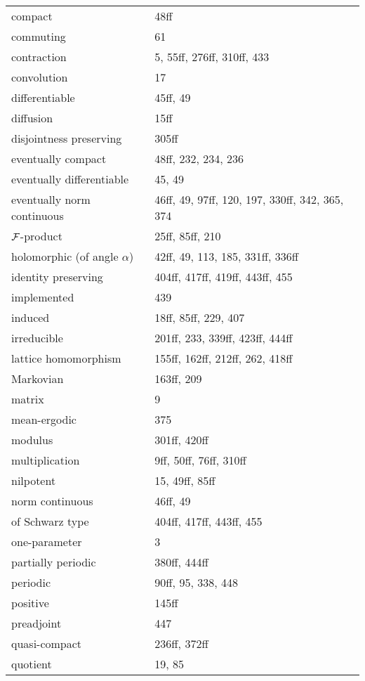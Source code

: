 \begin{longtable}{p{6cm}p{8cm}}
	\quad  compact 	& 48ff \\
	\quad  commuting 	& 61 \\
	\quad  contraction 	& 5, 55ff, 276ff, 310ff, 433 \\
	\quad  convolution 	& 17 \\
	\quad  differentiable 	& 45ff, 49 \\
	\quad  diffusion 	& 15ff \\
	\quad  disjointness preserving 	& 305ff \\
	\quad  eventually compact 	& 48ff, 232, 234, 236 \\
	\quad  eventually differentiable 	& 45, 49 \\
	\quad  eventually norm continuous 	& 46ff, 49, 97ff, 120, 197, 330ff, 342, 365, 374 \\
	\quad  $\mathcal{F}$-product 	& 25ff, 85ff, 210 \\
	\quad  holomorphic (of angle $\alpha$) 	& 42ff, 49, 113, 185, 331ff, 336ff \\
	\quad  identity preserving 	& 404ff, 417ff, 419ff, 443ff, 455 \\
	\quad  implemented 	& 439 \\
	\quad  induced 	& 18ff, 85ff, 229, 407 \\
	\quad  irreducible 	& 201ff, 233, 339ff, 423ff, 444ff \\
	\quad  lattice homomorphism 	& 155ff, 162ff, 212ff, 262, 418ff \\
	\quad  Markovian 	& 163ff, 209 \\
	\quad  matrix 	& 9 \\
	\quad  mean-ergodic 	& 375 \\
	\quad  modulus 	& 301ff, 420ff \\
	\quad  multiplication 	& 9ff, 50ff, 76ff, 310ff \\
	\quad  nilpotent 	& 15, 49ff, 85ff \\
	\quad  norm continuous 	& 46ff, 49 \\
	\quad  of Schwarz type 	& 404ff, 417ff, 443ff, 455 \\
	\quad  one-parameter 	& 3 \\
	\quad  partially periodic 	& 380ff, 444ff \\
	\quad  periodic 	& 90ff, 95, 338, 448 \\
	\quad  positive 	& 145ff \\
	\quad  preadjoint 	& 447 \\
	\quad  quasi-compact 	& 236ff, 372ff \\
	\quad  quotient 	& 19, 85 \\

\end{longtable}
